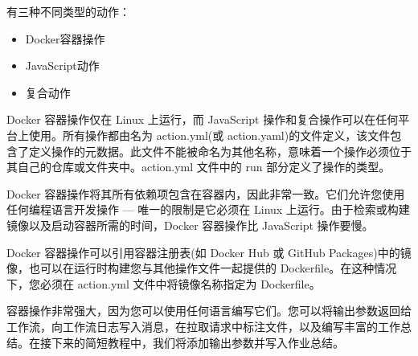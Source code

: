
有三种不同类型的动作：

\begin{itemize}
\item 
Docker容器操作

\item 
JavaScript动作

\item 
复合动作
\end{itemize}

Docker 容器操作仅在 Linux 上运行，而 JavaScript 操作和复合操作可以在任何平台上使用。所有操作都由名为 action.yml(或 action.yaml)的文件定义，该文件包含了定义操作的元数据。此文件不能被命名为其他名称，意味着一个操作必须位于其自己的仓库或文件夹中。action.yml 文件中的 run 部分定义了操作的类型。

Docker 容器操作将其所有依赖项包含在容器内，因此非常一致。它们允许您使用任何编程语言开发操作 --- 唯一的限制是它必须在 Linux 上运行。由于检索或构建镜像以及启动容器所需的时间，Docker 容器操作比 JavaScript 操作要慢。

Docker 容器操作可以引用容器注册表(如 Docker Hub 或 GitHub Packages)中的镜像，也可以在运行时构建您与其他操作文件一起提供的 Dockerfile。在这种情况下，您必须在 action.yml 文件中将镜像名称指定为 Dockerfile。


容器操作非常强大，因为您可以使用任何语言编写它们。您可以将输出参数返回给工作流，向工作流日志写入消息，在拉取请求中标注文件，以及编写丰富的工作总结。在接下来的简短教程中，我们将添加输出参数并写入作业总结。